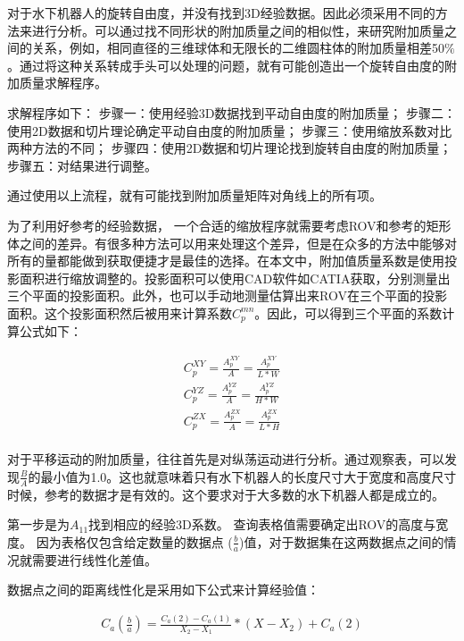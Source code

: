 对于水下机器人的旋转自由度，并没有找到3D经验数据。因此必须采用不同的方法来进行分析。可以通过找不同形状的附加质量之间的相似性，来研究附加质量之间的关系，例如，相同直径的三维球体和无限长的二维圆柱体的附加质量相差50$\%$。通过将这种关系转成手头可以处理的问题，就有可能创造出一个旋转自由度的附加质量求解程序。

求解程序如下：
步骤一：使用经验3D数据找到平动自由度的附加质量；
步骤二：使用2D数据和切片理论确定平动自由度的附加质量；
步骤三：使用缩放系数对比两种方法的不同；
步骤四：使用2D数据和切片理论找到旋转自由度的附加质量；
步骤五：对结果进行调整。

通过使用以上流程，就有可能找到附加质量矩阵对角线上的所有项。

为了利用好参考的经验数据， 一个合适的缩放程序就需要考虑ROV和参考的矩形体之间的差异。有很多种方法可以用来处理这个差异，但是在众多的方法中能够对所有的量都能做到获取便捷才是最佳的选择。在本文中，附加值质量系数是使用投影面积进行缩放调整的。投影面积可以使用CAD软件如CATIA获取，分别测量出三个平面的投影面积。此外，也可以手动地测量估算出来ROV在三个平面的投影面积。这个投影面积然后被用来计算系数$C_{p}^{mn}$。因此，可以得到三个平面的系数计算公式如下：

\begin{equation}
\begin{aligned}
C_{p}^{XY} = \frac{A_{p}^{XY}}{A} = \frac{A_{p}^{XY}}{L \ast W} \\
C_{p}^{YZ} = \frac{A_{p}^{YZ}}{A} = \frac{A_{p}^{YZ}}{H \ast W} \\
C_{p}^{ZX} = \frac{A_{p}^{ZX}}{A} = \frac{A_{p}^{ZX}}{L \ast H} \\
\end{aligned}
\end{equation}

对于平移运动的附加质量，往往首先是对纵荡运动进行分析。通过观察表，可以发现$\frac{B}{A}$的最小值为1.0。这也就意味着只有水下机器人的长度尺寸大于宽度和高度尺寸时候，参考的数据才是有效的。这个要求对于大多数的水下机器人都是成立的。

第一步是为$A_{11}$找到相应的经验3D系数。 查询表格值需要确定出ROV的高度与宽度。 因为表格仅包含给定数量的数据点
($\frac{b}{a}$)值，对于数据集在这两数据点之间的情况就需要进行线性化差值。

数据点之间的距离线性化是采用如下公式来计算经验值：

\begin{equation}
\begin{aligned}
C_a(\frac{b}{a}) = \frac{C_a(2)-C_a(1)}{X_2 - X_1} \ast  (X - X_2) + C_a(2)
\end{aligned}
\end{equation}

